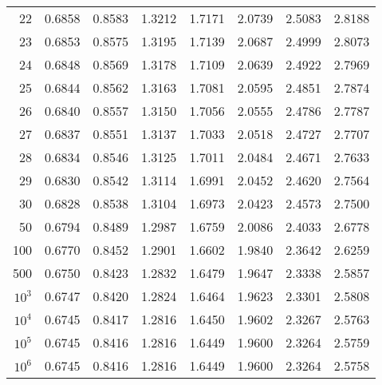 \begin{minipage}{\textwidth}
\begin{tabular}{|r|rrrrrrr|}
22&0.6858&0.8583&1.3212&1.7171&2.0739&2.5083&2.8188\\
\rowcolor[gray]{.9}
23&0.6853&0.8575&1.3195&1.7139&2.0687&2.4999&2.8073\\
24&0.6848&0.8569&1.3178&1.7109&2.0639&2.4922&2.7969\\
\rowcolor[gray]{.9}
25&0.6844&0.8562&1.3163&1.7081&2.0595&2.4851&2.7874\\
26&0.6840&0.8557&1.3150&1.7056&2.0555&2.4786&2.7787\\
\rowcolor[gray]{.9}
27&0.6837&0.8551&1.3137&1.7033&2.0518&2.4727&2.7707\\
28&0.6834&0.8546&1.3125&1.7011&2.0484&2.4671&2.7633\\
\rowcolor[gray]{.9}
29&0.6830&0.8542&1.3114&1.6991&2.0452&2.4620&2.7564\\
30&0.6828&0.8538&1.3104&1.6973&2.0423&2.4573&2.7500\\
\rowcolor[gray]{.9}
50&0.6794&0.8489&1.2987&1.6759&2.0086&2.4033&2.6778\\
100&0.6770&0.8452&1.2901&1.6602&1.9840&2.3642&2.6259\\
\rowcolor[gray]{.9}
500&0.6750&0.8423&1.2832&1.6479&1.9647&2.3338&2.5857\\
$10^3$&0.6747&0.8420&1.2824&1.6464&1.9623&2.3301&2.5808\\
\rowcolor[gray]{.9}
$10^4$&0.6745&0.8417&1.2816&1.6450&1.9602&2.3267&2.5763\\
$10^5$&0.6745&0.8416&1.2816&1.6449&1.9600&2.3264&2.5759\\
\rowcolor[gray]{.9}
$10^6$&0.6745&0.8416&1.2816&1.6449&1.9600&2.3264&2.5758\\
\hline
\end{tabular}
    \end{minipage}


